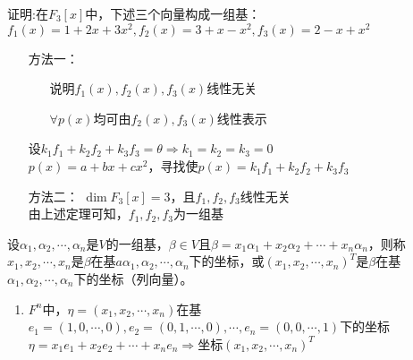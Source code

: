 \begin{property}[线性空间的性质]
    \begin{example}
        证明:在$F_3[x]$中，下述三个向量构成一组基：
        $f_1(x) = 1 + 2x + 3x^2, f_2(x) = 3 + x - x^2, f_3(x) = 2 - x + x^2$
        \begin{itemize}
            \item[方法一：]
            \begin{itemize}
                \item[\circled{1}] 说明$f_1(x), f_2(x), f_3(x)$线性无关
                \item[\circled{2}] $\forall p(x)$均可由$f_2(x), f_3(x)$线性表示
            \end{itemize} 
             设$k_1 f_1 + k_2f_2 + k_3f_3 = \theta \Rightarrow k_1 = k_2 = k_3 = 0$\\
             $p(x) = a + bx + cx^2$，寻找使$p(x) = k_1f_1 + k_2f_2 + k_3f_3$
            \item[方法二：]
            $\dim F_3[x] = 3$，且$f_1, f_2, f_3$线性无关\\
            由上述定理可知，$f_1, f_2, f_3$为一组基  
        \end{itemize}
    \end{example}

    \begin{definition}[坐标]
        设$\alpha_1, \alpha_2, \cdots, \alpha_n$是$V$的一组基，$\beta \in V$且$\beta = x_1\alpha_1 + x_2\alpha_2 + \cdots + x_n\alpha_n$，则称$x_1, x_2, \cdots, x_n$是$\beta$在基$a\alpha_1, \alpha_2, \cdots, \alpha_n$下的坐标，或$(x_1, x_2, \cdots, x_n)^T$是$\beta$在基$\alpha_1, \alpha_2, \cdots, \alpha_n$下的坐标（列向量）。
    \end{definition}

    \begin{example}
        \begin{enumerate}
            \item $F^n$中，$\eta = (x_1, x_2, \cdots, x_n)$在基$e_1 = (1, 0, \cdots, 0), e_2 = (0, 1, \cdots, 0), \cdots, e_n = (0, 0, \cdots, 1)$下的坐标\\
            $\eta = x_1e_1 + x_2e_2 + \cdots + x_ne_n \Rightarrow$坐标$(x_1, x_2, \cdots, x_n)^T$


\end{enumerate}
\end{example}
\end{property}
